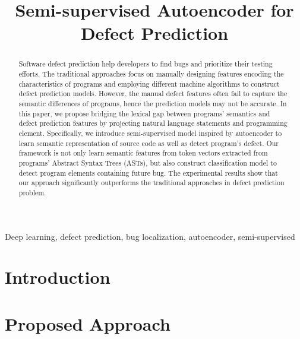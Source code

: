 \documentclass[10pt,conference]{IEEEtran}
\begin{document}
	
\title{Semi-supervised Autoencoder for Defect Prediction}

\author{
}

\maketitle

\begin{abstract}\label{sec:abstract}
Software defect prediction help developers to find bugs and prioritize their testing efforts. The traditional approaches focus on manually designing features encoding the characteristics of programs and employing different machine algorithms to construct defect prediction models. However, the manual defect features often fail to capture the semantic differences of programs, hence the prediction models may not be accurate. 
In this paper, we propose bridging the lexical gap between programs' semantics and defect prediction features by projecting natural language statements and programming element. Specifically, we introduce semi-supervised model inspired by autoencoder to learn semantic representation of source code as well as detect program's defect. Our framework is not only learn semantic features from token vectors extracted from programs' Abstract Syntax Trees (ASTs), but also construct classification model to detect program elements containing future bug. The experimental results show that our approach significantly outperforms the traditional approaches in defect prediction problem. 
\end{abstract}

\IEEEpeerreviewmaketitle

\begin{IEEEkeywords}
Deep learning, defect prediction, bug localization, autoencoder, semi-supervised
\end{IEEEkeywords}

\section{Introduction}
\label{sec:introduction}


\section{Proposed Approach}
\label{sec:framework}

\end{document}
